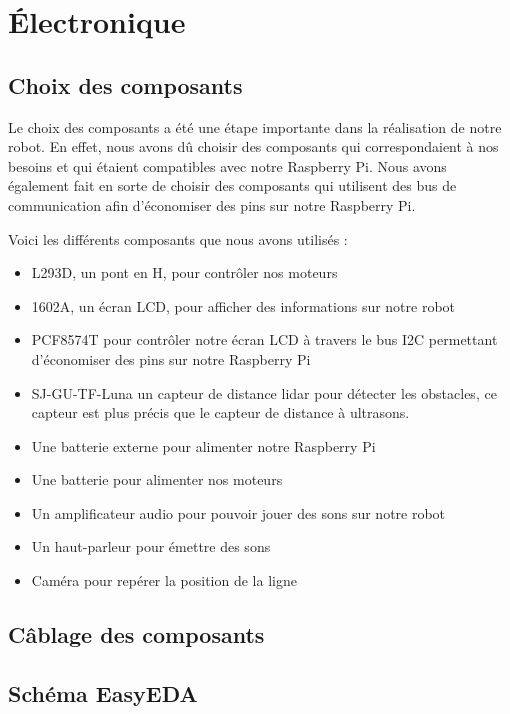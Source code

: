 \section{Électronique}

\subsection{Choix des composants}

Le choix des composants a été une étape importante dans la réalisation de notre robot.
En effet, nous avons dû choisir des composants qui correspondaient à nos besoins et qui étaient compatibles avec notre Raspberry Pi. 
Nous avons également fait en sorte de choisir des composants qui utilisent des bus de communication afin d'économiser des pins sur notre Raspberry Pi.

Voici les différents composants que nous avons utilisés :
\begin{itemize}
    \item L293D, un pont en H, pour contrôler nos moteurs
    \item 1602A, un écran LCD, pour afficher des informations sur notre robot
    \item PCF8574T pour contrôler notre écran LCD à travers le bus I2C permettant d'économiser des pins sur notre Raspberry Pi
    \item SJ-GU-TF-Luna un capteur de distance lidar pour détecter les obstacles, ce capteur est plus précis que le capteur de distance à ultrasons.
    \item Une batterie externe pour alimenter notre Raspberry Pi
    \item Une batterie pour alimenter nos moteurs
    \item Un amplificateur audio pour pouvoir jouer des sons sur notre robot
    \item Un haut-parleur pour émettre des sons
    \item Caméra pour repérer la position de la ligne
\end{itemize}

\subsection{Câblage des composants}

\todo

\subsection{Schéma EasyEDA}

\todo